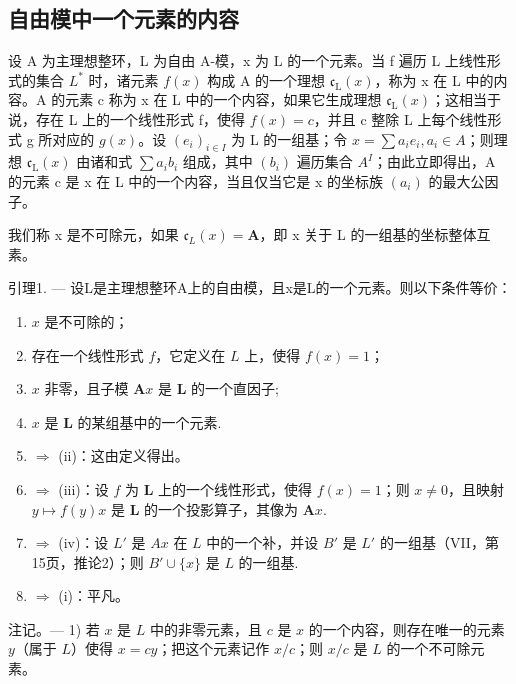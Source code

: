 \subsection{自由模中一个元素的内容}

设 A 为主理想整环，L 为自由 A-模，x 为 L 的一个元素。当 f 遍历 L 上线性形式的集合 \(L^{*}\) 时，诸元素 \(f(x)\) 构成 A 的一个理想 \(\mathfrak{c}_{\mathrm{L}}(x)\)，称为 x 在 L 中的内容。A 的元素 c 称为 x 在 L 中的一个内容，如果它生成理想 \(\mathfrak{c}_{\mathrm{L}}(x)\)；这相当于说，存在 L 上的一个线性形式 f，使得 \(f(x)=c\)，并且 c 整除 L 上每个线性形式 g 所对应的 \(g(x)\)。设 \((e_{i})_{i\in I}\) 为 L 的一组基；令 \(x=\sum a_{i}e_{i}, a_{i}\in A\)；则理想 \(\mathfrak{c}_{\mathrm{L}}(x)\) 由诸和式 \(\sum a_{i}b_{i}\) 组成，其中 \((b_{i})\) 遍历集合 \(A^{I}\)；由此立即得出，A 的元素 c 是 x 在 L 中的一个内容，当且仅当它是 x 的坐标族 \((a_{i})\) 的最大公因子。

我们称 x 是不可除元，如果 \(\mathfrak{c}_{L}(x)=\mathbf{A}\)，即 x 关于 L 的一组基的坐标整体互素。

引理1. --- 设L是主理想整环A上的自由模，且x是L的一个元素。则以下条件等价：

\begin{enumerate}
\def\labelenumi{(\roman{enumi})}
\item
  \(x\) 是不可除的；
\item
  存在一个线性形式 \(f\)，它定义在 \(L\) 上，使得 \(f(x) = 1\)；
\item
  \(x\) 非零，且子模 \(\mathbf{A}x\) 是 \(\mathbf{L}\) 的一个直因子;
\item
  \(x\) 是 \(\mathbf{L}\) 的某组基中的一个元素.
\item
  \(\Rightarrow\) (ii)：这由定义得出。
\item
  \(\Rightarrow\) (iii)：设 \(f\) 为 \(\mathbf{L}\) 上的一个线性形式，使得 \(f(x) = 1\)；则 \(x \neq 0\)，且映射 \(y \mapsto f(y)x\) 是 \(\mathbf{L}\) 的一个投影算子，其像为 \(\mathbf{A}x\).
\item
  \(\Rightarrow\) (iv)：设 \(L'\) 是 \(Ax\) 在 \(L\) 中的一个补，并设 \(B'\) 是 \(L'\) 的一组基（VII，第15页，推论2）；则 \(B' \cup \{x\}\) 是 \(L\) 的一组基.
\item
  \(\Rightarrow\) (i)：平凡。
\end{enumerate}

注记。--- 1) 若 \(x\) 是 \(L\) 中的非零元素，且 \(c\) 是 \(x\) 的一个内容，则存在唯一的元素 \(y\)（属于 \(L\)）使得 \(x = cy\)；把这个元素记作 \(x / c\)；则 \(x / c\) 是 \(L\) 的一个不可除元素。


